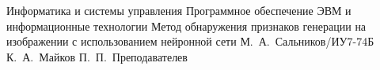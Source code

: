 \documentclass{bmstu}
\begin{document}
	
	\makethesistitle
	{Информатика и системы управления}
	{Программное обеспечение ЭВМ и информационные технологии}
	{Метод обнаружения признаков генерации на изображении с использованием нейронной сети}
	{М.~А.~Сальников/ИУ7-74Б}
	{К.~А.~Майков}
	{}
	{П.~П.~Преподавателев}
	
	\setcounter{page}{2}
	
	\maketableofcontents
	
	
	
	
	
	
	
	
	
	
	
	\makebibliography
	
	
	
	
\end{document}
